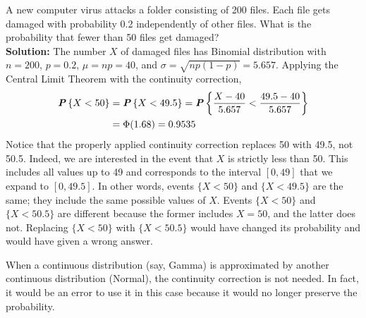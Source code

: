 \begin{example}{}
    A new computer virus attacks a folder consisting of 200 files. Each file gets damaged with probability 0.2 independently of other files. What is the probability that fewer than 50 files get damaged?\\

    \textbf{Solution:} The number $X$ of damaged files has Binomial distribution with $n = 200$, $p = 0.2$, $\mu = np = 40$, and $\sigma = \sqrt{np(1-p)} = 5.657$. Applying the Central Limit Theorem with the continuity correction,
    \begin{align*}
        \textbf{\textit{P}}\left\{X < 50\right\} &= \textbf{\textit{P}}\left\{X < 49.5\right\} = \textbf{\textit{P}}\left\{\frac{X-40}{5.657} < \frac{49.5-40}{5.657}\right\}\\
        &= \Phi(1.68) = 0.9535
    \end{align*}
    Notice that the properly applied continuity correction replaces 50 with 49.5, not 50.5. Indeed, we are interested in the event that $X$ is strictly less than 50. This includes all values up to 49 and corresponds to the interval $\left[ 0, 49 \right]$ that we expand to $\left[ 0, 49.5 \right]$. In other words, events $\{X < 50\}$ and $\{X < 49.5\}$ are the same; they include the same possible values of $X$. Events $\{X < 50\}$ and $\{X < 50.5\}$ are different because the former includes $X = 50$, and the latter does not. Replacing $\{X < 50\}$ with $\{X < 50.5\}$ would have changed its probability and would have given a wrong answer.
\end{example}

When a continuous distribution (say, Gamma) is approximated by another continuous distribution (Normal), the continuity correction is not needed. In fact, it would be an error to use it in this case because it would no longer preserve the probability.

